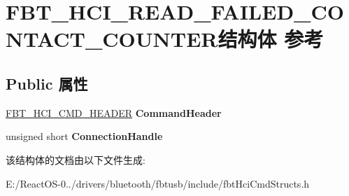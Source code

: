 \hypertarget{struct_f_b_t___h_c_i___r_e_a_d___f_a_i_l_e_d___c_o_n_t_a_c_t___c_o_u_n_t_e_r}{}\section{F\+B\+T\+\_\+\+H\+C\+I\+\_\+\+R\+E\+A\+D\+\_\+\+F\+A\+I\+L\+E\+D\+\_\+\+C\+O\+N\+T\+A\+C\+T\+\_\+\+C\+O\+U\+N\+T\+E\+R结构体 参考}
\label{struct_f_b_t___h_c_i___r_e_a_d___f_a_i_l_e_d___c_o_n_t_a_c_t___c_o_u_n_t_e_r}
\subsection*{Public 属性}
\begin{DoxyCompactItemize}
\item 
\mbox{\label{struct_f_b_t___h_c_i___r_e_a_d___f_a_i_l_e_d___c_o_n_t_a_c_t___c_o_u_n_t_e_r_a09f30091e6a31b16d8c9186757235257}} 
\hyperlink{struct_f_b_t___h_c_i___c_m_d___h_e_a_d_e_r}{F\+B\+T\+\_\+\+H\+C\+I\+\_\+\+C\+M\+D\+\_\+\+H\+E\+A\+D\+ER} {\bfseries Command\+Header}
\item 
\mbox{\label{struct_f_b_t___h_c_i___r_e_a_d___f_a_i_l_e_d___c_o_n_t_a_c_t___c_o_u_n_t_e_r_afa7400e2be6f7a32df534a216dfd1e94}} 
unsigned short {\bfseries Connection\+Handle}
\end{DoxyCompactItemize}


该结构体的文档由以下文件生成\+:\begin{DoxyCompactItemize}
\item 
E\+:/\+React\+O\+S-\/0../drivers/bluetooth/fbtusb/include/fbt\+Hci\+Cmd\+Structs.\+h\end{DoxyCompactItemize}
